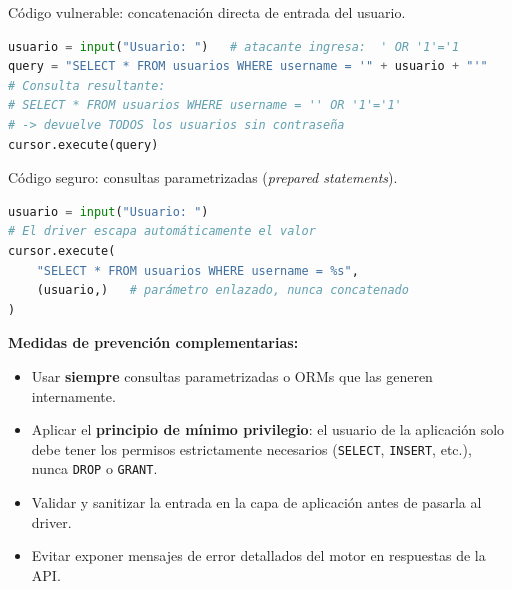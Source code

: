 \begin{ejemplo}
  Código vulnerable: concatenación directa de entrada del usuario.

\begin{lstlisting}[language=Python, basicstyle=\ttfamily\small,
    keywordstyle=\bfseries\color{NavyBlue},
    commentstyle=\itshape\color{Gray},
    backgroundcolor=\color{gray!6}, frame=single,
    caption={Código VULNERABLE a SQL Injection}]
usuario = input("Usuario: ")   # atacante ingresa:  ' OR '1'='1
query = "SELECT * FROM usuarios WHERE username = '" + usuario + "'"
# Consulta resultante:
# SELECT * FROM usuarios WHERE username = '' OR '1'='1'
# -> devuelve TODOS los usuarios sin contraseña
cursor.execute(query)
\end{lstlisting}
\end{ejemplo}

\begin{ejemplo}
  Código seguro: consultas parametrizadas (\textit{prepared statements}).

\begin{lstlisting}[language=Python, basicstyle=\ttfamily\small,
    keywordstyle=\bfseries\color{NavyBlue},
    commentstyle=\itshape\color{Gray},
    backgroundcolor=\color{gray!6}, frame=single,
    caption={Prevención con consultas parametrizadas}]
usuario = input("Usuario: ")
# El driver escapa automáticamente el valor
cursor.execute(
    "SELECT * FROM usuarios WHERE username = %s",
    (usuario,)   # parámetro enlazado, nunca concatenado
)
\end{lstlisting}
\end{ejemplo}

\textbf{Medidas de prevención complementarias:}

\begin{itemize}
  \item Usar \textbf{siempre} consultas parametrizadas o ORMs que las
        generen internamente.
  \item Aplicar el \textbf{principio de mínimo privilegio}: el usuario de
        la aplicación solo debe tener los permisos estrictamente necesarios
        (\texttt{SELECT}, \texttt{INSERT}, etc.), nunca \texttt{DROP} o
        \texttt{GRANT}.
  \item Validar y sanitizar la entrada en la capa de aplicación antes de
        pasarla al driver.
  \item Evitar exponer mensajes de error detallados del motor en respuestas
        de la API.
\end{itemize}

